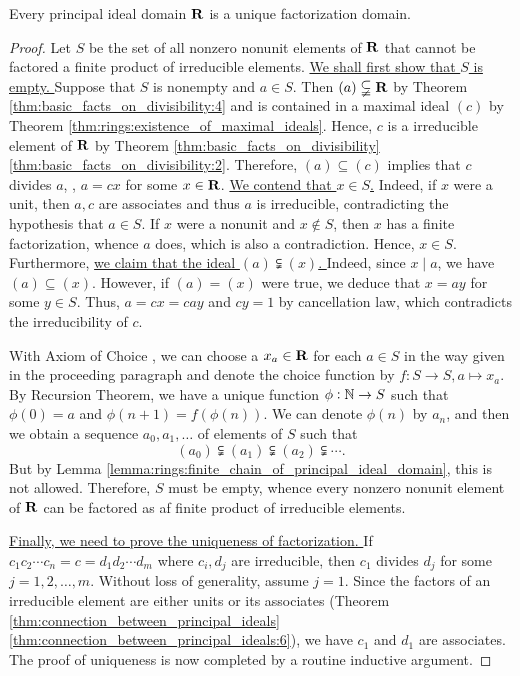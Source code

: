 \begin{thm}
\label{thm:principal_domain_UFD}
Every principal ideal domain $\mathbf{R}$ is a unique factorization domain. 
\end{thm}
\begin{proof}
Let $S$ be the set of all nonzero nonunit elements of $\mathbf{R}$ that cannot 
be factored a finite product of irreducible elements. 
\underline{We shall first show that $S$ is empty. }
Suppose that $S$ is nonempty and $a \in S$. 
Then $(a) \subsetneqq \mathbf{R}$ by Theorem \ref{thm:basic_facts_on_divisibility:4} 
and is contained in a maximal ideal $(c)$ by Theorem 
\ref{thm:rings:existence_of_maximal_ideals}. 
Hence, $c$ is a irreducible element of $\mathbf{R}$ by Theorem 
\ref{thm:basic_facts_on_divisibility} \ref{thm:basic_facts_on_divisibility:2}. 
Therefore, $(a) \subseteq (c)$ implies that $c$ divides $a$, \ie, $a = cx$ for 
some $x \in \mathbf{R}$. 
\underline{We contend that $x \in S$.} 
Indeed, if $x$ were a unit, then $a, c$ are associates and thus $a$ is 
irreducible, contradicting the hypothesis that $a \in S$. 
If $x$ were a nonunit and $x \not \in S$, then $x$ has a finite 
factorization, whence $a$ does, which is also a contradiction. 
Hence, $x \in S$. 
Furthermore, \underline{we claim that the ideal $(a) \subsetneqq (x)$. }
Indeed, since $x \mid a$, we have $(a) \subseteq (x)$. 
However, if $(a) = (x)$ were true, we deduce that $x = ay$ for some $y \in S$. 
Thus, $a = cx = cay$ and $cy = 1$ by cancellation law, which contradicts the 
irreducibility of $c$. 

With Axiom of Choice , we can choose a 
$x_a \in \mathbf{R}$ for each $a \in S$ in the way given in the proceeding 
paragraph and denote the choice function by $f: S \to S, a \mapsto x_a$. 
By Recursion Theorem, we have a unique function $\phi: \mathbb{N} \to S$ such that 
$\phi(0) = a$ and $\phi(n+1) = f(\phi(n))$. 
We can denote $\phi(n)$ by $a_n$, and then we obtain a sequence $a_0, a_1, 
\ldots$ of elements of $S$ such that 
\begin{equation}
    (a_0) \subsetneqq (a_1) \subsetneqq (a_2) \subsetneqq \cdots.
\end{equation}
But by Lemma \ref{lemma:rings:finite_chain_of_principal_ideal_domain}, 
this is not allowed. 
Therefore, $S$ must be empty, whence every nonzero nonunit element of $\mathbf{R}$ 
can be factored as af finite product of irreducible elements. 

\underline{Finally, we need to prove the uniqueness of factorization. }
If $c_1c_2\cdots c_n = c = d_1d_2\cdots d_m$ where $c_i, d_j$ are 
irreducible, then $c_1$ divides $d_j$ for some $j=1, 2, \ldots, m$. 
Without loss of generality, assume $j = 1$. 
Since the factors of an irreducible element are either units or its 
associates (Theorem \ref{thm:connection_between_principal_ideals}
\ref{thm:connection_between_principal_ideals:6}), we have $c_1$ and $d_1$ 
are associates. 
The proof of uniqueness is now completed by a routine inductive argument. 
\end{proof}

